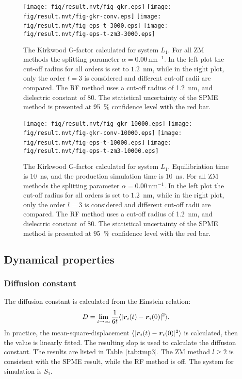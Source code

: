 \documentclass[aip,jcp,a4paper,preprint,unsortedaddress,onecolumn,fleqn]{revtex4-1}
\newcommand{\vect}[1]{\textbf{\textit{#1}}}
\newcommand{\systemsb}{S_1}
\newcommand{\systemlb}{L_1}
\begin{document}
\begin{figure}
  \centering
  \texttt{[image: fig/result.nvt/fig-gkr.eps]}
  \texttt{[image: fig/result.nvt/fig-gkr-conv.eps]}
  \texttt{[image: fig/result.nvt/fig-eps-t-3000.eps]}
  \texttt{[image: fig/result.nvt/fig-eps-t-zm3-3000.eps]}
  \caption{The Kirkwood G-factor calculated for system $\systemlb$.
    For all ZM methods the splitting parameter $\alpha = 0.00\,\textrm{nm}^{-1}$.
    In the left plot the cut-off radius for all orders is set to $1.2$~nm, while
    in the right plot, only the order $l=3$ is considered and different cut-off radii are compared.
    The RF method uses a cut-off radius of 1.2~nm, and dielectric constant of 80.
    The statistical uncertainty of the SPME method is presented at 95~\% confidence level with the red bar.
  }
  \label{fig:tmp2}
\end{figure}

\begin{figure}
  \centering
  \texttt{[image: fig/result.nvt/fig-gkr-10000.eps]}
  \texttt{[image: fig/result.nvt/fig-gkr-conv-10000.eps]}
  \texttt{[image: fig/result.nvt/fig-eps-t-10000.eps]}
  \texttt{[image: fig/result.nvt/fig-eps-t-zm3-10000.eps]}
  \caption{The Kirkwood G-factor calculated for system $\systemlb$. Equilibriation time is 10~ns, and the production simulation time is 10~ns.
    For all ZM methods the splitting parameter $\alpha = 0.00\,\textrm{nm}^{-1}$.
    In the left plot the cut-off radius for all orders is set to $1.2$~nm, while
    in the right plot, only the order $l=3$ is considered and different cut-off radii are compared.
    The RF method uses a cut-off radius of 1.2~nm, and dielectric constant of 80.
    The statistical uncertainty of the SPME method is presented at 95~\% confidence level with the red bar.
  }
  \label{fig:tmp3}
\end{figure}



\subsection{Dynamical properties}

\subsubsection{Diffusion constant}
The diffusion constant is calculated from the Einstein relation:
\begin{align}
  D = \lim_{t\rightarrow \infty}\frac {1}{6t} \langle \vert \vect r_i(t) - \vect r_i(0)\vert^2\rangle.
\end{align}
In practice, the mean-square-displacement $\langle\vert \vect r_i(t) - \vect
r_i(0)\vert^2\rangle$ is calculated, then the value is linearly fitted. The
resulting slop is used to calculate the diffusion constant. The results are listed in Table~\ref{tab:tmp3}.
The ZM method $l\geq 2$ is consistent with the SPME
result, while the RF method is off. The system for simulation is $\systemsb$.
\end{document}
